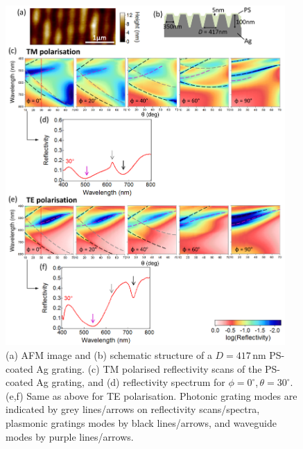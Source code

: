 \begin{figure}[h!] 
\centering    
\includegraphics[width=0.95\textwidth]{Fig11}
\caption[(a) AFM image and (b) schematic structure of $D=417$\,nm PS-coated Ag grating. Reflectivity measurements of PS-coated Ag grating in (c,d) TM and (e.f) TE polarisation.]{(a) AFM image and (b) schematic structure of a $D=417$\,nm PS-coated Ag grating. (c) TM polarised reflectivity scans of the PS-coated Ag grating, and (d) reflectivity spectrum for $\phi=0^{\circ}$,\,$\theta=30^{\circ}$. (e,f) Same as above for TE polarisation. Photonic grating modes are indicated by grey lines/arrows on reflectivity scans/spectra, plasmonic gratings modes by black lines/arrows, and waveguide modes by purple lines/arrows.}
\label{7Fig11}
\end{figure}
